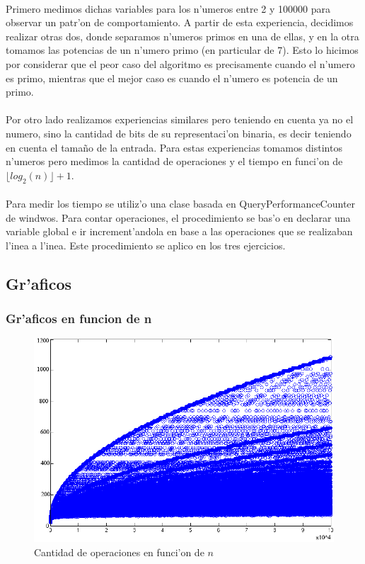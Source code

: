 \paragraph{}
Primero medimos dichas variables para los n'umeros entre 2 y 100000 para observar un patr'on de comportamiento. A partir de esta experiencia, decidimos realizar otras dos, donde separamos n'umeros primos en una de ellas, y en la otra tomamos las 
potencias de un n'umero primo (en particular de 7). Esto lo hicimos por considerar que el peor caso del algoritmo es 
precisamente cuando el n'umero es primo, mientras que el mejor caso es cuando el n'umero es potencia de un primo. 
\paragraph{}
Por otro lado realizamos experiencias similares pero teniendo en cuenta ya no el numero, sino la cantidad de bits 
de su representaci'on binaria, es decir teniendo en cuenta el tama\~{n}o de la entrada. Para estas experiencias 
tomamos distintos n'umeros pero medimos la cantidad de operaciones y el tiempo en funci'on de $\lfloor log_2(n) \rfloor + 1$.
\paragraph{}
Para medir los tiempo se utiliz'o una clase basada en QueryPerformanceCounter de windwos. Para contar operaciones, el procedimiento se bas'o en declarar una variable global e ir increment'andola en base a las operaciones que se realizaban l'inea a l'inea. Este procedimiento se aplico en los tres ejercicios.

\subsection{Gr'aficos}
\subsubsection{Gr'aficos en funcion de n}

\begin{figure}[H]
\centering
\includegraphics[scale=0.7]{../../codigo/ejercicio1/benchmark/graficos/todos_los_numeros/graficosTodos.png}
\caption{Cantidad de operaciones en funci'on de $n$}
\label{Ej1fig1}
\end{figure}


